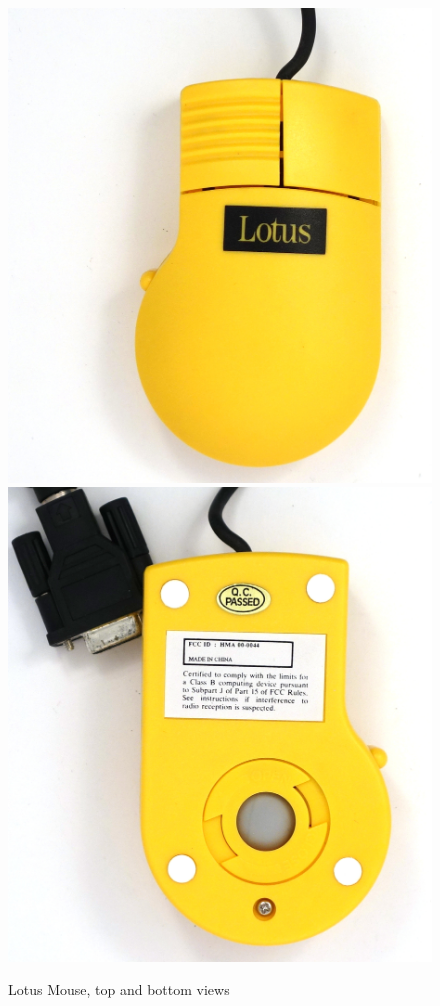 \documentclass[11pt, a4paper]{article}
\begin{document}
\begin{figure}[h]
    \centering
    \includegraphics[scale=0.3]{1992_lotus_mouse/top_30.jpg}
    \includegraphics[scale=0.3]{1992_lotus_mouse/bottom_30.jpg}
    \caption{Lotus Mouse, top and bottom views}
    \label{fig:LotusTopBottom}
\end{figure}
\end{document}
